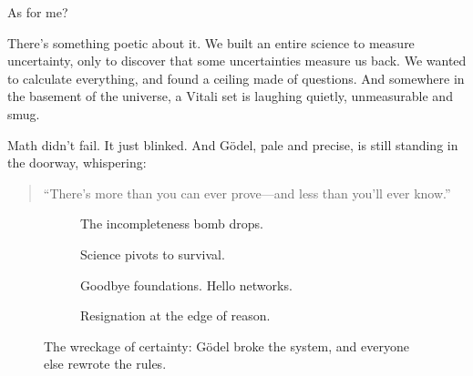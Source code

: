 As for me?

There’s something poetic about it. We built an entire science to measure uncertainty, only to discover that some uncertainties measure us back. We wanted to calculate everything, and found a ceiling made of questions. And somewhere in the basement of the universe, a Vitali set is laughing quietly, unmeasurable and smug.

Math didn’t fail. It just blinked. And Gödel, pale and precise, is still standing in the doorway, whispering:

\begin{quote}
“There’s more than you can ever prove—and less than you’ll ever know.”
\end{quote}



\begin{figure}[H]
\centering

\begin{subfigure}[t]{0.45\textwidth}
\centering
{}
\caption*{The incompleteness bomb drops.}
\end{subfigure}
\hfill
\begin{subfigure}[t]{0.45\textwidth}
\centering
{}
\caption*{Science pivots to survival.}
\end{subfigure}

\vspace{1em}

\begin{subfigure}[t]{0.45\textwidth}
\centering
{}
\caption*{Goodbye foundations. Hello networks.}
\end{subfigure}
\hfill
\begin{subfigure}[t]{0.45\textwidth}
\centering
{}
\caption*{Resignation at the edge of reason.}
\end{subfigure}

\caption{The wreckage of certainty: Gödel broke the system, and everyone else rewrote the rules.}
\end{figure}






